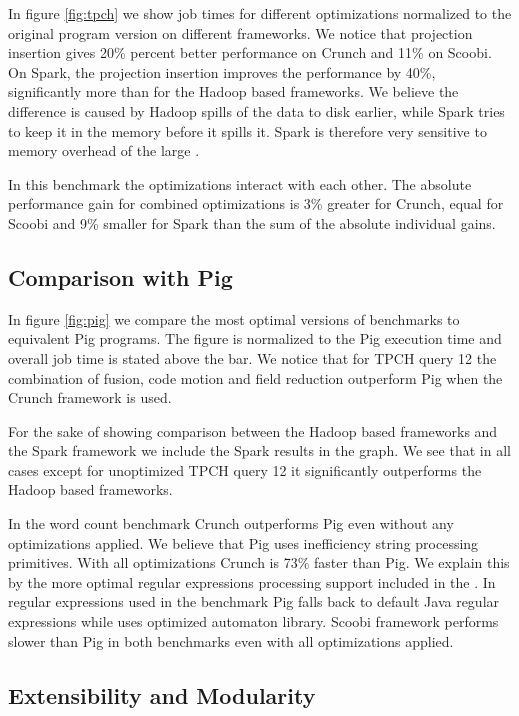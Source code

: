 In figure \ref{fig:tpch} we show job times for different optimizations normalized to the original program version on different frameworks. We notice that projection insertion gives 20\% percent better performance on Crunch and 11\% on Scoobi. On Spark, the projection insertion improves the performance by 40\%, significantly more than for the Hadoop based frameworks. We believe the difference is caused by Hadoop spills of the data to disk earlier, while Spark tries to keep it in the memory before it spills it. Spark is therefore very sensitive to memory overhead of the large .

In this benchmark the optimizations interact with each other. The absolute performance gain for combined optimizations is 3\% greater for Crunch, equal for Scoobi and 9\% smaller for Spark than the sum of the absolute individual gains.

\subsection{Comparison with Pig}
\label{subsec:pig}

In figure \ref{fig:pig} we compare the most optimal versions of benchmarks to equivalent Pig programs. The figure is normalized to the Pig execution time and overall job time is stated above the bar. We notice that for TPCH query 12 the combination of fusion, code motion and field reduction outperform Pig when the Crunch framework is used. 

For the sake of showing comparison between the Hadoop based frameworks and the Spark framework we include the Spark results in the graph. We see that in all cases except for unoptimized TPCH query 12 it significantly outperforms the Hadoop based frameworks.

In the word count benchmark Crunch outperforms Pig even without any optimizations applied. We believe that Pig uses inefficiency string processing primitives. With all optimizations Crunch is 73\% faster than Pig. We explain this by the more optimal regular expressions processing support included in the \tool. In regular expressions used in the benchmark Pig falls back to default Java regular expressions while \tool uses optimized automaton library. Scoobi framework performs slower than Pig in both benchmarks even with all optimizations applied.


\subsection{Extensibility and Modularity}
\label{subsec:kmeans}

